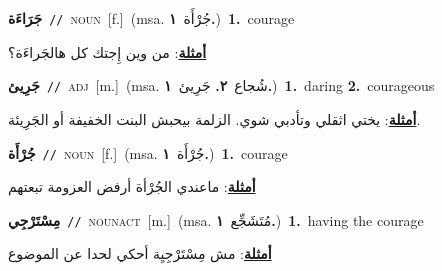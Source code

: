 \documentclass[10pt,a4paper,twoside]{article} %
\begin{document}
\begin{multicols}{2}
{\setlength\topsep{0pt}\textbf{\foreignlanguage{arabic}{جَرَاءَة}}\ {\color{gray}\texttt{//}\color{black}}\ \textsc{noun}\ [f.]\ \color{gray}(msa. \foreignlanguage{arabic}{جُرْأَة}~\foreignlanguage{arabic}{\textbf{١.}})\color{black}\ \textbf{1.}~courage\  \begin{flushright}\color{gray}\foreignlanguage{arabic}{\textbf{\underline{\foreignlanguage{arabic}{أمثلة}}}: من وين إِجتك كل هالجَراءَة؟}\end{flushright}\color{black}} \vspace{2mm}

{\setlength\topsep{0pt}\textbf{\foreignlanguage{arabic}{جَرِيئ}}\ {\color{gray}\texttt{//}\color{black}}\ \textsc{adj}\ [m.]\ \color{gray}(msa. \foreignlanguage{arabic}{شُجاع}~\foreignlanguage{arabic}{\textbf{٢.}}  \foreignlanguage{arabic}{جَرِيئ}~\foreignlanguage{arabic}{\textbf{١.}})\color{black}\ \textbf{1.}~daring  \textbf{2.}~courageous\  \begin{flushright}\color{gray}\foreignlanguage{arabic}{\textbf{\underline{\foreignlanguage{arabic}{أمثلة}}}: يختي اثقلي وتأدبي شوي. الزلمة بيحبش البنت الخفيفة أو الجَرِيئة.}\end{flushright}\color{black}} \vspace{2mm}

{\setlength\topsep{0pt}\textbf{\foreignlanguage{arabic}{جُرْأَة}}\ {\color{gray}\texttt{//}\color{black}}\ \textsc{noun}\ [f.]\ \color{gray}(msa. \foreignlanguage{arabic}{جُرْأَة}~\foreignlanguage{arabic}{\textbf{١.}})\color{black}\ \textbf{1.}~courage\  \begin{flushright}\color{gray}\foreignlanguage{arabic}{\textbf{\underline{\foreignlanguage{arabic}{أمثلة}}}: ماعندي الجُرْأة أرفض العزومة تبعتهم}\end{flushright}\color{black}} \vspace{2mm}

{\setlength\topsep{0pt}\textbf{\foreignlanguage{arabic}{مِسْتَرْجِي}}\ {\color{gray}\texttt{//}\color{black}}\ \textsc{noun\textunderscore act}\ [m.]\ \color{gray}(msa. \foreignlanguage{arabic}{مُتَشَجِّع}~\foreignlanguage{arabic}{\textbf{١.}})\color{black}\ \textbf{1.}~having the courage\  \begin{flushright}\color{gray}\foreignlanguage{arabic}{\textbf{\underline{\foreignlanguage{arabic}{أمثلة}}}: مش مِسْتَرْجِيِة أحكي لحدا عن الموضوع}\end{flushright}\color{black}} \vspace{2mm}


\end{multicols}
\end{document}
